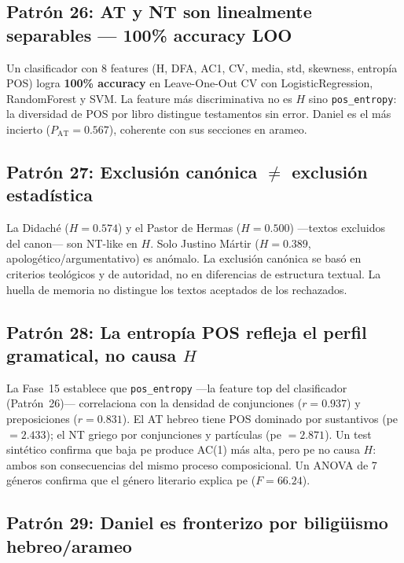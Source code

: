 \documentclass[12pt,a4paper]{article}
\begin{document}
\subsection{Patr\'on 26: AT y NT son linealmente separables --- 100\% accuracy LOO}

Un clasificador con 8 features (H, DFA, AC1, CV, media, std, skewness,
entrop\'ia POS) logra \textbf{100\% accuracy} en Leave-One-Out CV con
LogisticRegression, RandomForest y SVM. La feature m\'as discriminativa
no es $H$ sino \texttt{pos\_entropy}: la diversidad de POS por libro
distingue testamentos sin error. Daniel es el m\'as incierto
($P_{\text{AT}} = 0.567$), coherente con sus secciones en arameo.

\subsection{Patr\'on 27: Exclusi\'on can\'onica $\neq$ exclusi\'on estad\'istica}

La Didach\'e ($H = 0.574$) y el Pastor de Hermas ($H = 0.500$) ---textos
excluidos del canon--- son NT-like en $H$. Solo Justino M\'artir
($H = 0.389$, apolog\'etico/argumentativo) es an\'omalo. La exclusi\'on
can\'onica se bas\'o en criterios teol\'ogicos y de autoridad, no en
diferencias de estructura textual. La huella de memoria no distingue
los textos aceptados de los rechazados.


\subsection{Patr\'on 28: La entrop\'ia POS refleja el perfil gramatical, no causa $H$}

La Fase~15 establece que \texttt{pos\_entropy} ---la feature top del clasificador
(Patr\'on~26)--- correlaciona con la densidad de conjunciones ($r = 0.937$) y
preposiciones ($r = 0.831$). El AT hebreo tiene POS dominado por sustantivos
(pe $= 2.433$); el NT griego por conjunciones y part\'iculas (pe $= 2.871$).
Un test sint\'etico confirma que baja pe produce AC(1) m\'as alta, pero pe
no causa $H$: ambos son consecuencias del mismo proceso composicional.
Un ANOVA de 7 g\'eneros confirma que el g\'enero literario explica pe ($F = 66.24$).

\subsection{Patr\'on 29: Daniel es fronterizo por bilig\"uismo hebreo/arameo}
\end{document}

